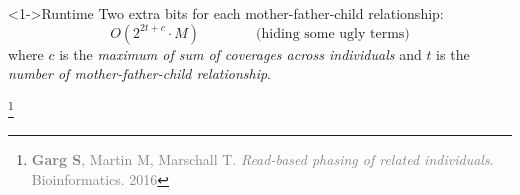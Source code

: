 \documentclass[notes=hide]{beamer}
\begin{document}
% 		
% 		
% 	
% 		
% 	


\begin{frame}{}
	\begin{block}<1->{Runtime}
		Two extra bits for each mother-father-child relationship:
\[O(2^{2t+c}\cdot M)\qquad\qquad\text{(hiding some ugly terms)}\]
		where $c$ is the \emph{maximum of sum of coverages across individuals} and $t$ is the \emph{number of mother-father-child relationship}.
	\end{block}
	\let\thefootnote\relax\footnote{\scriptsize\textcolor{gray}{\textbf{Garg S}, Martin M, Marschall T. \textit{Read-based phasing of related individuals}. Bioinformatics. 2016}}
\end{frame}
\end{document}
